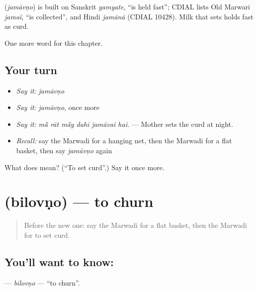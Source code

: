 \begin{cousinweb}
\textbf{} (\emph{jamāvṇo}) is built on Sanskrit \emph{yamyate}, \textquotedblleft{}is held fast\textquotedblright{}; CDIAL lists Old Marwari \emph{jamaï}, \textquotedblleft{}is collected\textquotedblright{}, and Hindi \emph{jamānā} (CDIAL 10428). Milk that sets holds fast as curd.
\end{cousinweb}

\begin{grammarlens}[title={What you've built}]
One more word for this chapter.
\end{grammarlens}

\subsection*{Your turn}
\begin{itemize}
\raggedright
  \item \emph{Say it:} \emph{jamāvṇo}
  \item \emph{Say it:} \emph{jamāvṇo}, once more
  \item \emph{Say it:} \emph{mā̃ rāt mā̃y dahī jamāvai hai.} — Mother sets the curd at night.
  \item \emph{Recall:} say the Marwadi for a hanging net, then the Marwadi for a flat basket, then say \emph{jamāvṇo} again
\end{itemize}

\begin{tcolorbox}[breakable,colback=teal!4,colframe=teal!35!black,title={Before you move on}]
What does  mean? (\textquotedblleft{}To set curd\textquotedblright{}.) Say it once more.
\end{tcolorbox}
\section[\texorpdfstring{\mw{बिलोवणो} (bilovṇo)}{बिलोवणो (bilovṇo)}]{ (bilovṇo) — to churn}

\label{lesson:MW-C181-bilovno}



\begin{quote}
Before the new one: say the Marwadi for a flat basket, then the Marwadi for to set curd.
\end{quote}

\subsection*{You'll want to know: }
\textbf{} — \emph{bilovṇo} — \textquotedblleft{}to churn\textquotedblright{}.

